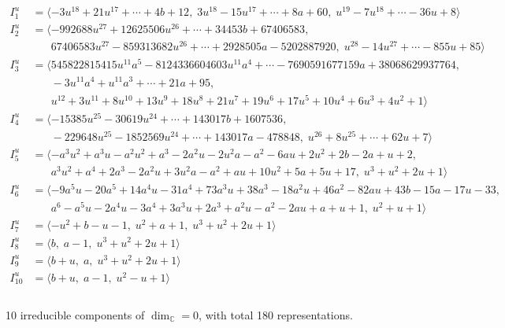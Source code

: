 \documentclass[1p]{elsarticle_modified}
\theoremstyle{definition}
\begin{document}
\begin{align*}
I^u_{1}&=\langle 
-3 u^{18}+21 u^{17}+\cdots+4 b+12,\;3 u^{18}-15 u^{17}+\cdots+8 a+60,\;u^{19}-7 u^{18}+\cdots-36 u+8\rangle \\
I^u_{2}&=\langle 
-992688 u^{27}+12625506 u^{26}+\cdots+34453 b+67406583,\\
\phantom{I^u_{2}}&\phantom{= \langle  }67406583 u^{27}-859313682 u^{26}+\cdots+2928505 a-5202887920,\;u^{28}-14 u^{27}+\cdots-855 u+85\rangle \\
I^u_{3}&=\langle 
545822815415 u^{11} a^5-8124336604603 u^{11} a^4+\cdots-7690591677159 a+38068629937764,\\
\phantom{I^u_{3}}&\phantom{= \langle  }-3 u^{11} a^4+u^{11} a^3+\cdots+21 a+95,\\
\phantom{I^u_{3}}&\phantom{= \langle  }u^{12}+3 u^{11}+8 u^{10}+13 u^9+18 u^8+21 u^7+19 u^6+17 u^5+10 u^4+6 u^3+4 u^2+1\rangle \\
I^u_{4}&=\langle 
-15385 u^{25}-30619 u^{24}+\cdots+143017 b+1607536,\\
\phantom{I^u_{4}}&\phantom{= \langle  }-229648 u^{25}-1852569 u^{24}+\cdots+143017 a-478848,\;u^{26}+8 u^{25}+\cdots+62 u+7\rangle \\
I^u_{5}&=\langle 
- a^3 u^2+a^3 u- a^2 u^2+a^3-2 a^2 u-2 u^2 a- a^2-6 a u+2 u^2+2 b-2 a+u+2,\\
\phantom{I^u_{5}}&\phantom{= \langle  }a^3 u^2+a^4+2 a^3-2 a^2 u+3 u^2 a- a^2+a u+10 u^2+5 a+5 u+17,\;u^3+u^2+2 u+1\rangle \\
I^u_{6}&=\langle 
-9 a^5 u-20 a^5+14 a^4 u-31 a^4+73 a^3 u+38 a^3-18 a^2 u+46 a^2-82 a u+43 b-15 a-17 u-33,\\
\phantom{I^u_{6}}&\phantom{= \langle  }a^6- a^5 u-2 a^4 u-3 a^4+3 a^3 u+2 a^3+a^2 u- a^2-2 a u+a+u+1,\;u^2+u+1\rangle \\
I^u_{7}&=\langle 
- u^2+b- u-1,\;u^2+a+1,\;u^3+u^2+2 u+1\rangle \\
I^u_{8}&=\langle 
b,\;a-1,\;u^3+u^2+2 u+1\rangle \\
I^u_{9}&=\langle 
b+u,\;a,\;u^3+u^2+2 u+1\rangle \\
I^u_{10}&=\langle 
b+u,\;a-1,\;u^2- u+1\rangle \\
\\
\end{align*}
\raggedright * 10 irreducible components of $\dim_{\mathbb{C}}=0$, with total 180 representations.\\
\end{document}
